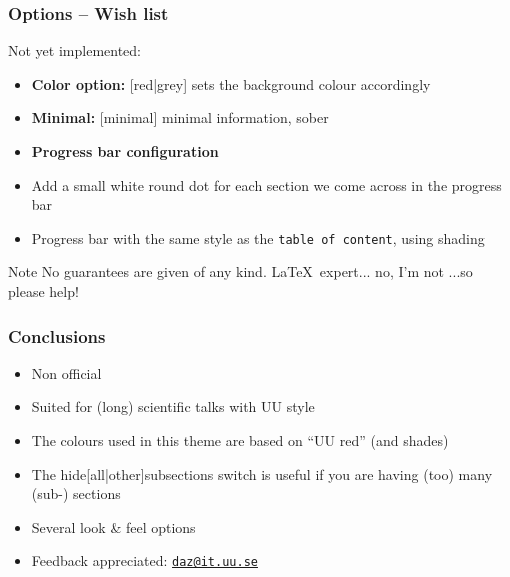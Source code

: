 \documentclass{beamer}
\begin{document}
\begin{frame}
  \frametitle{Options -- Wish list}
  Not yet implemented:
  \begin{itemize}
    \item{\textbf{Color option:} [red|grey] sets the background colour accordingly}
    \item{\textbf{Minimal:} [minimal] minimal information, sober}
    \item{\textbf{Progress bar configuration}}
    \item{Add a small white round dot for each section we come across in the progress bar}
    \item{Progress bar with the same style as the \texttt{table of content}, using shading}
  \end{itemize}

  \begin{alertblock}{Note}
    No guarantees are given of any kind.
    \vskip 5mm 
    \LaTeX\ expert... no, I'm not ...so please help!
  \end{alertblock}
  

\end{frame}

\begin{frame}
  \frametitle{Conclusions}

  \begin{itemize}
    \item Non official
    \item Suited for (long) scientific talks with UU style
    \item The colours used in this theme are based on  ``UU red'' (and shades)
    \item The hide[all|other]subsections switch is useful if you are having (too) many (sub-) sections
    \item Several look \& feel options
    \item Feedback appreciated: \href{mailto:daz@it.uu.se}{\texttt{daz@it.uu.se}}
  \end{itemize}
\end{frame}
\end{document}
